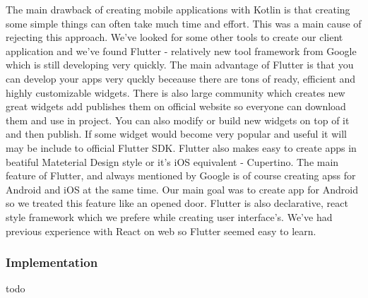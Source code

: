 \documentclass[../Main.tex]{subfiles}
\begin{document}
        The main drawback of creating mobile applications with Kotlin is that creating
        some simple things can often take much time and effort. 
        This was a main cause of rejecting this approach.
        We've looked for some other tools to create our client application and 
        we've found Flutter - relatively new tool framework from Google which 
        is still developing very quickly.
        The main advantage of Flutter is that you can develop your apps very 
        quckly beceause there are tons of ready, efficient and highly customizable 
        widgets. There is also large community which creates new great widgets 
        add publishes them on official website so everyone can download them and use in project.
        You can also modify or build new widgets on top of it and then publish.
        If some widget would become very popular and useful it will may be 
        include to official Flutter SDK. 
        Flutter also makes easy to create apps in beatiful Mateterial Design 
        style or it's iOS equivalent - Cupertino. 
        The main feature of Flutter, and always mentioned by Google is of course 
        creating apss for Android and iOS at the same time. 
        Our main goal was to create app for Android so we treated this feature like 
        an opened door. 
        Flutter is also declarative, react style framework which we prefere while
        creating user interface's. We've had previous experience with React on web
        so Flutter seemed easy to learn. 
        
    \subsubsection{Implementation}
    
    todo
        
    

\biblio %
\end{document}
